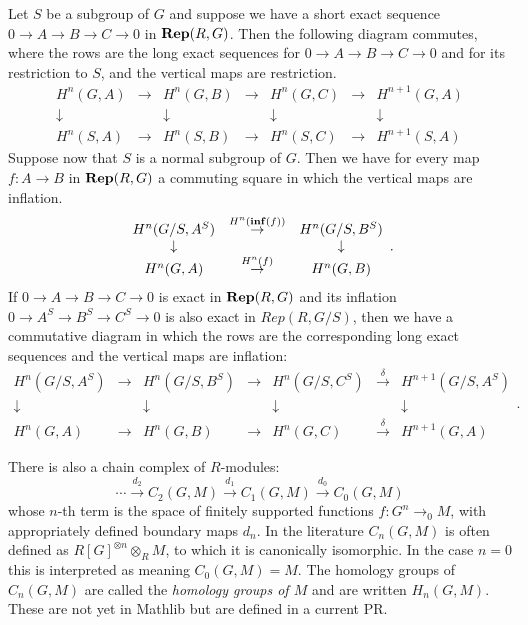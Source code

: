 \begin{lemma} \label{lem:inflation restriction naturality}
	\leanok
	Let $S$ be a subgroup of $G$ and suppose we have a short exact sequence
	$0 \to A \to B \to C \to 0$ in $\mathbf{Rep}(R,G)$.
	Then the following diagram commutes, where the rows are the long exact sequences
	for $0 \to A \to B \to C \to 0$ and for its restriction to $S$,
	and the vertical maps are restriction.
	\[
  	\begin{array}{ccccccc}
			H^n(G,A) & \to & H^n(G,B) &\to &H^n(G,C)& \to& H^{n+1}(G,A)\\
			\downarrow&&\downarrow&&\downarrow&&\downarrow \\
			H^n(S,A) & \to & H^n(S,B) &\to &H^n(S,C)& \to& H^{n+1}(S,A)
		\end{array}
  \]
	Suppose now that $S$ is a normal subgroup of $G$. Then we have for every
	map $f : A \to B$ in $\mathbf{Rep}(R,G)$ a commuting square in which the vertical maps are inflation.
	\[
  	\begin{array}{ccccccc}
			H^n(G/S,A^S) & \stackrel{H^n(\mathbf{inf}(f))}\to & H^n(G/S,B^S)\\
			\downarrow&&\downarrow \\
			H^n(G,A) & \stackrel{H^n(f)}\to & H^n(G,B)
		\end{array}.
	\]
	If $0 \to A \to B \to C \to 0$ is exact in $\mathbf{Rep}(R,G)$ and its inflation
	$0 \to A^S \to B^S \to C^S \to 0$ is also exact in $Rep(R,G/S)$, then
	we have a commutative diagram in which the rows are the corresponding long exact
	sequences and the vertical maps are inflation:
	\[
  	\begin{array}{ccccccc}
			H^n(G/S,A^S) & \to & H^n(G/S,B^S) &\to &H^n(G/S,C^S)& \stackrel{\delta}\to& H^{n+1}(G/S,A^S)\\
			\downarrow&&\downarrow&&\downarrow&&\downarrow \\
			H^n(G,A) & \to & H^n(G,B) &\to &H^n(G,C)& \stackrel{\delta}\to& H^{n+1}(G,A)
		\end{array}.
  \]
\end{lemma}

\begin{definition} \label{def:group homology}
	There is also a chain complex of $R$-modules:
	\[
		\cdots \stackrel{d_2}\to C_2(G,M) \stackrel{d_1}\to C_1(G,M) \stackrel{d_0}\to C_0(G,M)
	\]
	whose $n$-th term is the space of finitely supported functions
	$f : G^n \to_0 M$, with appropriately defined boundary maps $d_n$.
	In the literature $C_n(G,M)$ is often defined as $R[G]^{\otimes n} \otimes_R M$, to which it is
	canonically isomorphic.
	In the case $n=0$ this is interpreted as meaning $C_0(G,M) = M$.
	The homology groups of $C_n(G,M)$ are called the \emph{homology groups of $M$}
	and are written $H_n(G,M)$.
	These are not yet in Mathlib but are defined in a current PR.
\end{definition}

